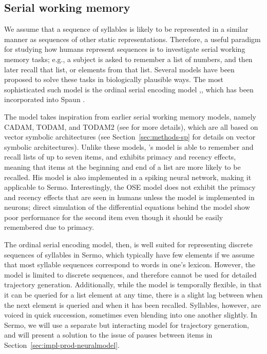 \subsection{Serial working memory}

We assume that a sequence of syllables
is likely to be represented
in a similar manner
as sequences of other static representations.
Therefore, a useful paradigm for studying
how humans represent sequences
is to investigate serial working memory tasks;
e.g., a subject is asked to remember
a list of numbers,
and then later recall that list,
or elements from that list.
Several models have been proposed
to solve these tasks
in biologically plausible ways.
The most sophisticated such model
is the ordinal serial encoding model
\cite{choo2010},,
which has been incorporated into
Spaun \cite{eliasmith2012}.

The model takes inspiration from
earlier serial working memory models,
namely CADAM, TODAM, and TODAM2
(see \cite{choo2010} for more details),
which are all based on
vector symbolic architectures
(see Section~\ref{sec:methods-sp}
for details on vector symbolic architectures).
Unlike these models,
\citeauthor{choo2010}'s model
is able to remember and recall
lists of up to seven items,
and exhibits primacy and recency effects,
meaning that items at the beginning
and end of a list are more likely
to be recalled.
His model is also implemented
in a spiking neural network,
making it applicable to Sermo.
Interestingly,
the OSE model does not exhibit
the primacy and recency effects
that are seen in humans
unless the model
is implemented in neurons;
direct simulation of the differential equations
behind the model show
poor performance for the second item
even though it should be easily remembered
due to primacy.

The ordinal serial encoding model,
then, is well suited for representing
discrete sequences of syllables in Sermo,
which typically have few elements
if we assume that most syllable sequences
correspond to words in one's lexicon.
However, the model is limited to
discrete sequences,
and therefore cannot be used
for detailed trajectory generation.
Additionally,
while the model is temporally flexible,
in that it can be queried for
a list element at any time,
there is a slight lag between
when the next element is queried
and when it has been recalled.
Syllables, however, are voiced in quick succession,
sometimes even blending into one another slightly.
In Sermo, we will use a separate but interacting model
for trajectory generation,
and will present a solution
to the issue of pauses between items
in Section~\ref{sec:impl-prod-neuralmodel}.

